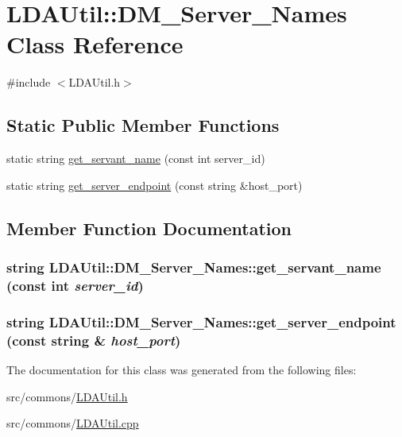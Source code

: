 \hypertarget{class_l_d_a_util_1_1_d_m___server___names}{
\section{LDAUtil::DM\_\-Server\_\-Names Class Reference}
\label{class_l_d_a_util_1_1_d_m___server___names}
}


{\ttfamily \#include $<$LDAUtil.h$>$}

\subsection*{Static Public Member Functions}
\begin{DoxyCompactItemize}
\item 
static string \hyperlink{class_l_d_a_util_1_1_d_m___server___names_ae31bd1aadd41e319e950ede5453a5f3f}{get\_\-servant\_\-name} (const int server\_\-id)
\item 
static string \hyperlink{class_l_d_a_util_1_1_d_m___server___names_a66c2e1a0a2a9a6a322af821e20e2d323}{get\_\-server\_\-endpoint} (const string \&host\_\-port)
\end{DoxyCompactItemize}


\subsection{Member Function Documentation}
\hypertarget{class_l_d_a_util_1_1_d_m___server___names_ae31bd1aadd41e319e950ede5453a5f3f}{
\subsubsection[{get\_\-servant\_\-name}]{\setlength{\rightskip}{0pt plus 5cm}string LDAUtil::DM\_\-Server\_\-Names::get\_\-servant\_\-name (const int {\em server\_\-id})}}
\label{class_l_d_a_util_1_1_d_m___server___names_ae31bd1aadd41e319e950ede5453a5f3f}
\hypertarget{class_l_d_a_util_1_1_d_m___server___names_a66c2e1a0a2a9a6a322af821e20e2d323}{
\subsubsection[{get\_\-server\_\-endpoint}]{\setlength{\rightskip}{0pt plus 5cm}string LDAUtil::DM\_\-Server\_\-Names::get\_\-server\_\-endpoint (const string \& {\em host\_\-port})}}
\label{class_l_d_a_util_1_1_d_m___server___names_a66c2e1a0a2a9a6a322af821e20e2d323}


The documentation for this class was generated from the following files:\begin{DoxyCompactItemize}
\item 
src/commons/\hyperlink{_l_d_a_util_8h}{LDAUtil.h}\item 
src/commons/\hyperlink{_l_d_a_util_8cpp}{LDAUtil.cpp}\end{DoxyCompactItemize}
